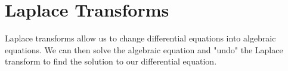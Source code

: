 \chapter{Laplace Transforms}
\noindent
Laplace transforms allow us to change differential equations into algebraic equations. We can then solve the algebraic equation and "undo" the Laplace transform to find the solution to our differential equation.





